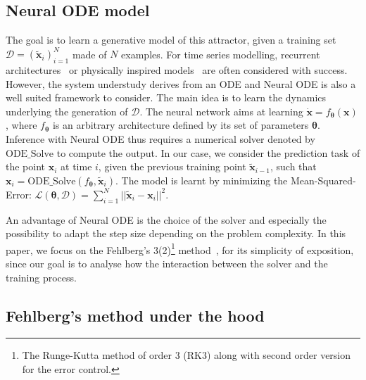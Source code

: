 \documentclass{article}
\newcommand{\dataset}{\ensuremath{\mathcal{D}}}
\newcommand{\loss}{\ensuremath{\mathcal{L}}}
\newcommand{\ntrain}{\ensuremath{N}}
\newcommand{\x}{\ensuremath{\mathbf{x}}} %
\newcommand{\tx}{\ensuremath{\tilde{\mathbf{x}}}} %
\newcommand{\params}{\ensuremath{\boldsymbol{\theta}}}
\newcommand{\nnet}{\ensuremath{f_{\params}}}
\begin{document}
\subsection{Neural ODE model}
\label{ssec:NODE-1}

The goal is to learn a generative model of this attractor, given a
training set $\dataset=(\tx_{i})_{i=1}^{\ntrain}$ made of $\ntrain$
examples. For time series modelling, recurrent
architectures~\cite{Nassar18Tree,Dubois20Data} or physically inspired
models~\cite{Greydanus19Hamlitonian} are often considered with
success. However, the system understudy derives from an ODE and Neural
ODE is also a well suited framework to consider.
The main idea is to learn the dynamics underlying the generation of
$\dataset$. The neural network aims at learning
$ \dot{\x} = \nnet (\x)$, where $\nnet$ is an arbitrary architecture
defined by its set of parameters $\params$. Inference with Neural ODE
thus requires a numerical solver denoted by $\textrm{ODE\_Solve}$ to
compute the output. In our case, we consider the prediction task of
the point ${\x}_{i}$ at time $i$, given the previous training point
$\tx_{i-1}$, such that ${\x}_{i}=\textrm{ODE\_Solve}(\nnet, \tx_i)$.
The model is learnt by minimizing the Mean-Squared-Error:
$\loss(\params, \dataset) = \sum_{i=1}^{N} ||\tilde{\x}_i - \x_i
||^2$.


An advantage of Neural ODE is the choice of the solver and especially
the possibility to adapt the step size depending on the problem
complexity. In this paper, we focus on the Fehlberg's
3(2)\footnote{The Runge-Kutta method of order 3 (RK3) along with
  second order version for the error control.}
method~\cite{Fehlberg68}, for its simplicity of exposition, since our
goal is to analyse how the interaction between the solver and the
training process.


\subsection{Fehlberg's method under the hood}
\label{ssec:fehlberg}
\end{document}

